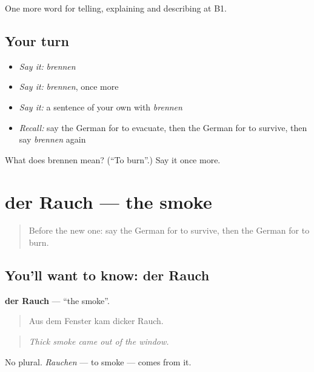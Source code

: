 \begin{grammarlens}[title={What you've built}]
One more word for telling, explaining and describing at B1.
\end{grammarlens}

\subsection*{Your turn}
\begin{itemize}
\raggedright
  \item \emph{Say it:} \emph{brennen}
  \item \emph{Say it:} \emph{brennen}, once more
  \item \emph{Say it:} a sentence of your own with \emph{brennen}
  \item \emph{Recall:} say the German for to evacuate, then the German for to survive, then say \emph{brennen} again
\end{itemize}

\begin{tcolorbox}[breakable,colback=teal!4,colframe=teal!35!black,title={Before you move on}]
What does brennen mean? (\textquotedblleft{}To burn\textquotedblright{}.) Say it once more.
\end{tcolorbox}
\section[der Rauch]{der Rauch — the smoke}

\label{lesson:GE-C293-rauch}



\begin{quote}
Before the new one: say the German for to survive, then the German for to burn.
\end{quote}

\subsection*{You'll want to know: der Rauch}
\textbf{der Rauch} — \textquotedblleft{}the smoke\textquotedblright{}.

\begin{quote}
Aus dem Fenster kam dicker Rauch.
\end{quote}

\begin{quote}
\emph{Thick smoke came out of the window.}
\end{quote}

No plural. \emph{Rauchen} — to smoke — comes from it.

